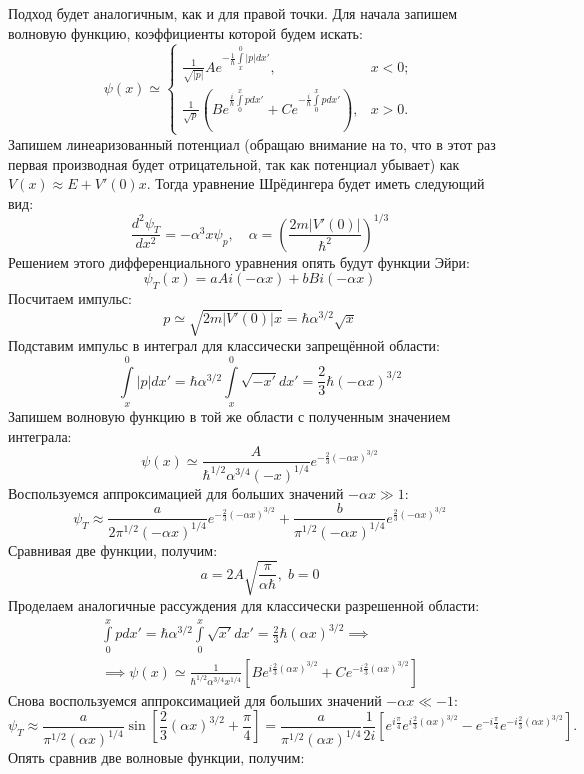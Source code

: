 Подход будет аналогичным, как и для правой точки. Для начала запишем волновую функцию, коэффициенты которой будем искать:
\[
\psi(x) \simeq 
\begin{cases}
     \frac{1}{\sqrt{|p|}}Ae^{-\frac{1}{\hbar}\int\limits_x^{0} |p| dx'}, & x < 0;\\
    \frac{1}{\sqrt{p}}\left( Be^{\frac{i}{\hbar}\int\limits_{0}^{x} p dx'} + Ce^{-\frac{i}{\hbar}\int\limits_{0}^{x} p dx'} \right), & x > 0.
\end{cases}
\]
Запишем линеаризованный потенциал (обращаю внимание на то, что в этот раз первая производная будет отрицательной, так как потенциал убывает) как $V(x) \approx E + V'(0)x$. Тогда уравнение Шрёдингера будет иметь следующий вид:
\[
    \frac{d^2\psi_T}{dx^2} = -\alpha^3 x\psi_p, \quad \alpha = \left( \frac{2m|V'(0)|}{\hbar^2} \right)^{1/3}
\]
Решением этого дифференциального уравнения опять будут функции Эйри:
\[
\psi_T(x) = aAi(-\alpha x) + bBi(-\alpha x)
\]
Посчитаем импульс:
\[
p \simeq \sqrt{2m|V'(0)|x} = \hbar\alpha^{3/2}\sqrt{x}
\]
Подставим импульс в интеграл для классически запрещённой области:
\[
\int\limits_{x}^{0} |p| dx' = \hbar\alpha^{3/2} \int\limits_{x}^{0}\sqrt{-x'} dx' = \frac{2}{3}\hbar(-\alpha x)^{3/2}
\]
Запишем волновую функцию в той же области с полученным значением интеграла:
\[
\psi(x) \simeq \frac{A}{\hbar^{1/2}\alpha^{3/4}(-x)^{1/4}} e^{-\frac{2}{3}(-\alpha x)^{3/2}}
\]
Воспользуемся аппроксимацией для больших значений $-\alpha x \gg 1$:
\[
\psi_T \approx \frac{a}{2\pi^{1/2}(-\alpha x)^{1/4}}e^{-\frac{2}{3}(-\alpha x)^{3/2}} + \frac{b}{\pi^{1/2}(-\alpha x)^{1/4}}e^{\frac{2}{3}(-\alpha x)^{3/2}}
\]
Сравнивая две функции, получим:
\[
a = 2A\sqrt{\frac{\pi}{\alpha\hbar}},\; b = 0
\]
Проделаем аналогичные рассуждения для классически разрешенной области:
\begin{gather*}
\int\limits_{0}^{x} p dx' = \hbar\alpha^{3/2} \int\limits_{0}^{x}\sqrt{x'} dx' = \frac{2}{3}\hbar(\alpha x)^{3/2} \implies \\
\implies \psi(x) \simeq \frac{1}{\hbar^{1/2}\alpha^{3/4}x^{1/4}}\left[ Be^{i\frac{2}{3}(\alpha x)^{3/2}} + Ce^{-i\frac{2}{3}(\alpha x)^{3/2}} \right]
\end{gather*}
Снова воспользуемся аппроксимацией для больших значений $-\alpha x \ll -1$:
\[
\psi_T \approx \frac{a}{\pi^{1/2}(\alpha x)^{1/4}}\sin\left[\frac{2}{3}(\alpha x)^{3/2} + \frac{\pi}{4}\right] = \frac{a}{\pi^{1/2}(\alpha x)^{1/4}}\frac{1}{2i}\left[ e^{i\frac{\pi}{4}}e^{i\frac{2}{3}(\alpha x)^{3/2}} - e^{-i\frac{\pi}{4}}e^{-i\frac{2}{3}(\alpha x)^{3/2}} \right].
\]
Опять сравнив две волновые функции, получим:
